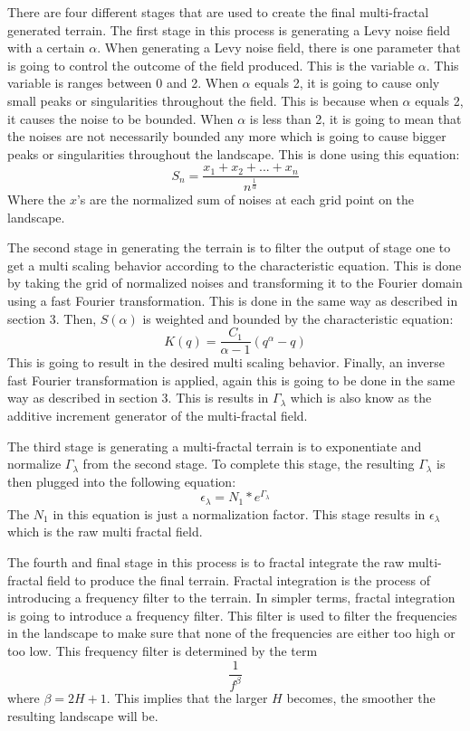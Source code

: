 \documentclass[11pt,twocolumn]{article}
\begin{document}
	There are four different stages that are used to create the final multi-fractal generated terrain. The first stage in this process is
	generating a Levy noise field with a certain $\alpha$. When generating a Levy noise field, there is one parameter that is going to
	control the outcome of the field produced. This is the variable $\alpha$. This variable is ranges between 0 and 2.
	When $\alpha$ equals 2, it is going to cause only small peaks or singularities throughout the field. This is because when $\alpha$ equals 2,
	it causes the noise to be bounded. When $\alpha$ is less than 2, it is going to mean that the noises are not necessarily
	bounded any more which is going to cause bigger peaks or singularities throughout the landscape.
	This is done using this equation: $${S_{n}} = \frac{{x_{1}} + {x_{2}} + ... + {x_{n}}}{n^{\frac{1}{\alpha}}}$$
	Where the $x$'s are the normalized sum of noises at each grid point on the landscape.
	
	The second stage in generating the terrain is to filter the output of stage one to get a multi scaling behavior according to the
	characteristic equation. This is done by taking the grid of normalized noises and transforming it to the Fourier domain using a
	fast Fourier transformation. This is done in the same way as described in section 3. Then, $S(\alpha)$ is weighted and
	bounded by the characteristic equation: $$K(q) = \frac{C_{1}}{\alpha - 1}\left(q^{\alpha} - q\right)$$ This is going to result in the
	desired multi scaling behavior. Finally, an inverse fast Fourier transformation is applied, again this is going to be done in the same
	way as described in section 3. This is results in $\Gamma_{\lambda}$ which is also know as the additive increment generator of
	the multi-fractal field.
	
	The third stage is generating a multi-fractal terrain is to exponentiate and normalize $\Gamma_{\lambda}$ from the second stage.
	To complete this stage, the resulting $\Gamma_\lambda$ is then plugged into the following equation:
	$${\epsilon_{\lambda}} = {N_{1}} * e^{{\Gamma_{\lambda}}}$$ The $N_{1}$ in this equation is just a normalization factor.
	This stage results in $\epsilon_{\lambda}$ which is the raw multi fractal field. 
	
	The fourth and final stage in this process is to fractal integrate the raw multi-fractal field to produce the final terrain.
	Fractal integration is the process of introducing a frequency filter to the terrain. In simpler terms, fractal integration is going to
	introduce a frequency filter. This filter is used to filter the frequencies in the landscape to make sure that none of the frequencies
	are either too high or too low.  This frequency filter is determined by the term $$\frac{1}{f^{\beta}}$$
	where $\beta = 2H + 1$. This implies that the larger $H$ becomes, the smoother the resulting landscape will be. 
\end{document}
